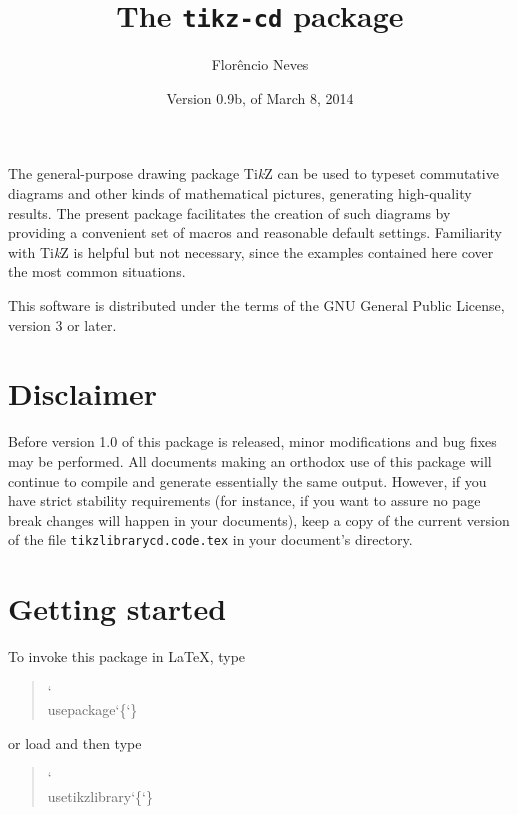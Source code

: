 \documentclass[a4paper]{ltxdoc}
\title{The \texttt{tikz-cd} package}
\author{Florêncio Neves}
\date{Version 0.9b, of March 8, 2014}
\begin{document}
\maketitle

The general-purpose drawing package Ti\emph{k}Z can be used to typeset
commutative diagrams and other kinds of mathematical pictures,
generating high-quality results.  The present package facilitates the
creation of such diagrams by providing a convenient set of macros and
reasonable default settings.  Familiarity with Ti\emph{k}Z is helpful
but not necessary, since the examples contained here cover the most
common situations.

This software is distributed under the terms of the GNU General Public
License, version 3 or later.

\tableofcontents

\setcounter{section}{-1}
\section{Disclaimer}
\label{sec:disclaimer}

Before version 1.0 of this package is released, minor modifications and
bug fixes may be performed.  All documents making an orthodox use of
this package will continue to compile and generate essentially the
same output.  However, if you have strict stability requirements (for
instance, if you want to assure no page break changes will happen in
your documents), keep a copy of the current version of the file
\texttt{tikzlibrarycd.code.tex} in your document's directory.

\section{Getting started}
\label{sec:basic-usage}

To invoke this package in \LaTeX, type

\begin{quote}
{{\ttfamily\char`\\usepackage\char`\{\char`\}}}
\end{quote}
or load \tikzname{} and then type
\begin{quote}%
   {{\ttfamily\char`\\usetikzlibrary\char`\{\char`\}}}%
\end{quote}
\end{document}
